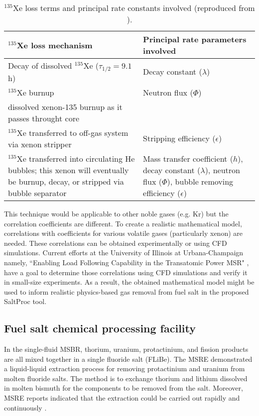 \begin{table}[ht!]
\caption{$^{135}$Xe loss terms and principal rate constants involved
 (reproduced from \cite{kedl_development_1967}).}
  \centering
\begin{tabularx}{\textwidth}{b | b}
\hline \textbf{$^{135}$Xe loss mechanism}      & \textbf{Principal rate 
parameters involved}  	\\
\hline Decay of dissolved $^{135}$Xe ($\tau_{1/2}=9.1$ h)  & Decay constant	($\lambda$)		\\
\hline $^{135}$Xe burnup              &  Neutron flux ($\Phi$)		 					\\
dissolved xenon-135 burnup as it passes throught core  & 			            \\		\hline $^{135}$Xe transferred to off-gas system via xenon stripper & Stripping efficiency ($\epsilon$)		\\
\hline $^{135}$Xe transferred into circulating He bubbles; this xenon will eventually be burnup, decay, or stripped via bubble separator & Mass transfer coefficient ($h$), decay constant ($\lambda$), 
neutron flux ($\Phi$), bubble removing efficiency ($\epsilon$)		\\
\hline 
\end{tabularx}
  		\label{tab:xe_loss}
\end{table}

This technique would be applicable to other noble gases (e.g. Kr) but the 
correlation coefficients are different. 
To create a realistic mathematical model, correlations with 
coefficients for various volatile gases (particularly xenon) are needed. These 
correlations can be obtained experimentally or using CFD simulations. 
Current efforts at the University of Illinois at Urbana-Champaign namely, ``Enabling 
Load Following Capability in the Transatomic Power MSR" \cite{huff_enabling_2018}, 
have a goal to determine those correlations using CFD simulations 
and verify it in small-size experiments. 
As a result, the obtained mathematical model might be used to inform realistic 
physics-based gas removal from fuel salt in the proposed SaltProc tool.

\subsection{Fuel salt chemical processing facility} \label{sec:chemical_processing}
In the single-fluid \gls{MSBR}, thorium, uranium, 
protactinium, and fission products are all mixed together in a single fluoride salt (FLiBe). The \gls{MSRE} demonstrated a liquid-liquid extraction process 
for removing protactinium and uranium from molten fluoride salts. The method 
is to exchange thorium and lithium dissolved in molten bismuth for the 
components to be removed from the salt. Moreover, \gls{MSRE} reports 
indicated that the extraction could be carried out rapidly and continuously 
\cite{whatley_engineering_1970-1}.

